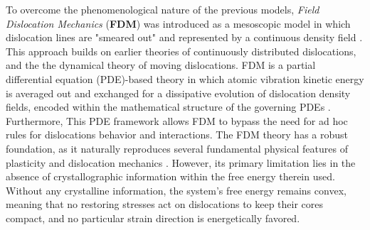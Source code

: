 \documentclass[11pt]{article}
\begin{document}
To overcome the phenomenological nature of the previous models, \emph{Field Dislocation Mechanics} (\textbf{FDM}) was introduced as a mesoscopic model in which dislocation lines are "smeared out" and represented by a continuous density field \parencite{acharyamodelcrystal2001} . This approach builds on earlier theories of continuously distributed dislocations, and the the dynamical theory of moving dislocations. FDM is a partial differential equation (PDE)-based theory in which atomic vibration kinetic energy is averaged out and exchanged for a dissipative evolution of dislocation density fields, encoded within the mathematical structure of the governing PDEs \parencite{acharyaNewinroads2010}. Furthermore, This PDE framework allows FDM to bypass the need for ad hoc rules for dislocations behavior and interactions. The FDM theory has a robust foundation, as it naturally reproduces several fundamental physical features of plasticity and dislocation mechanics \parencite{zhangsingletheory2015}. However, its primary limitation lies in the absence of crystallographic information within the free energy therein used. Without any crystalline information, the system’s free energy remains convex, meaning that no restoring stresses act on dislocations to keep their cores compact, and no  particular strain direction is energetically favored.\newline
\end{document}
